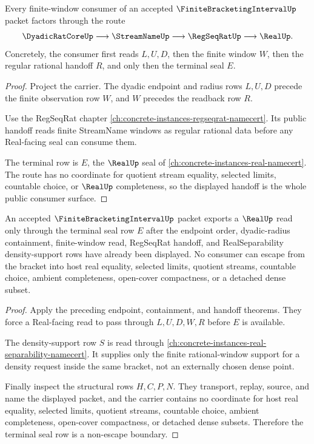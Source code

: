 \begin{theorem}
\label{thm:finite-bracketing-interval-regseqrat-handoff}
Every finite-window consumer of an accepted $\FiniteBracketingIntervalUp$ packet factors through the route
$$
\DyadicRatCoreUp \longrightarrow \StreamNameUp \longrightarrow \RegSeqRatUp \longrightarrow \RealUp .
$$
Concretely, the consumer first reads $L,U,D$, then the finite window $W$, then the regular rational handoff $R$, and only then the terminal seal $E$.
\end{theorem}
\begin{proof}
Project the carrier. The dyadic endpoint and radius rows $L,U,D$ precede the finite observation row $W$, and $W$ precedes the readback row $R$.

Use the RegSeqRat chapter \autoref{ch:concrete-instances-regseqrat-namecert}. Its public handoff reads finite StreamName windows as regular rational data before any Real-facing seal can consume them.

The terminal row is $E$, the $\RealUp$ seal of \autoref{ch:concrete-instances-real-namecert}. The route has no coordinate for quotient stream equality, selected limits, countable choice, or $\RealUp$ completeness, so the displayed handoff is the whole public consumer surface.
\end{proof}

\begin{theorem}
\label{thm:finite-bracketing-interval-real-seal-nonescape}
An accepted $\FiniteBracketingIntervalUp$ packet exports a $\RealUp$ read only through the terminal seal row $E$ after the endpoint order, dyadic-radius containment, finite-window read, RegSeqRat handoff, and RealSeparability density-support rows have already been displayed. No consumer can escape from the bracket into host real equality, selected limits, quotient streams, countable choice, ambient completeness, open-cover compactness, or a detached dense subset.
\end{theorem}
\begin{proof}
Apply the preceding endpoint, containment, and handoff theorems. They force a Real-facing read to pass through $L,U,D,W,R$ before $E$ is available.

The density-support row $S$ is read through \autoref{ch:concrete-instances-real-separability-namecert}. It supplies only the finite rational-window support for a density request inside the same bracket, not an externally chosen dense point.

Finally inspect the structural rows $H,C,P,N$. They transport, replay, source, and name the displayed packet, and the carrier contains no coordinate for host real equality, selected limits, quotient streams, countable choice, ambient completeness, open-cover compactness, or detached dense subsets. Therefore the terminal seal row is a non-escape boundary.
\end{proof}

